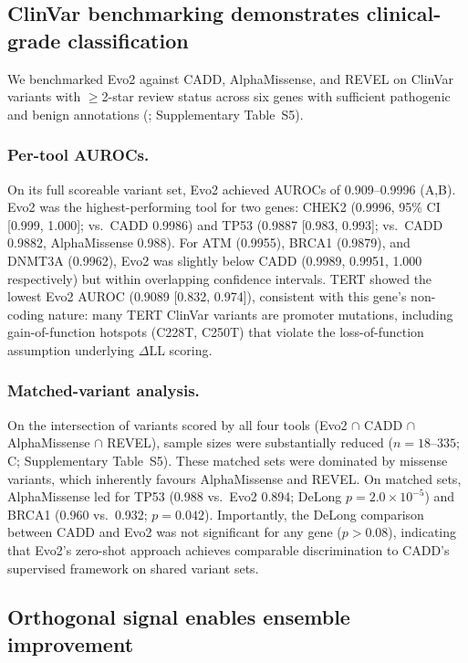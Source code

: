 \subsection{ClinVar benchmarking demonstrates clinical-grade classification}
\label{sec:results_clinvar}

We benchmarked Evo2 against CADD, AlphaMissense, and REVEL on ClinVar variants
with $\geq$2-star review status across six genes with sufficient pathogenic and
benign annotations (; Supplementary Table~S5).

\subsubsection*{Per-tool AUROCs.}

On its full scoreable variant set, Evo2 achieved AUROCs of 0.909--0.9996
(A,B). Evo2 was the highest-performing tool for two genes:
CHEK2 (0.9996, 95\% CI [0.999, 1.000]; vs.\ CADD 0.9986) and TP53 (0.9887
[0.983, 0.993]; vs.\ CADD 0.9882, AlphaMissense 0.988). For ATM (0.9955),
BRCA1 (0.9879), and DNMT3A (0.9962), Evo2 was slightly below CADD
(0.9989, 0.9951, 1.000 respectively) but within overlapping confidence
intervals. TERT showed the lowest Evo2 AUROC (0.9089 [0.832, 0.974]), consistent
with this gene's non-coding nature: many TERT ClinVar variants are promoter
mutations, including gain-of-function hotspots (C228T, C250T) that violate the
loss-of-function assumption underlying $\Delta$LL scoring.

\subsubsection*{Matched-variant analysis.}

On the intersection of variants scored by all four tools (Evo2 $\cap$ CADD
$\cap$ AlphaMissense $\cap$ REVEL), sample sizes were substantially reduced
($n = 18$--$335$; C; Supplementary Table~S5). These matched
sets were dominated by missense variants, which inherently favours
AlphaMissense and REVEL. On matched sets, AlphaMissense led for TP53
(0.988 vs.\ Evo2 0.894; DeLong $p = 2.0 \times 10^{-5}$) and BRCA1 (0.960 vs.\
0.932; $p = 0.042$). Importantly, the DeLong comparison between CADD and Evo2
was not significant for any gene ($p > 0.08$), indicating that Evo2's zero-shot
approach achieves comparable discrimination to CADD's supervised framework on
shared variant sets.

\subsection{Orthogonal signal enables ensemble improvement}
\label{sec:results_orthogonality}

